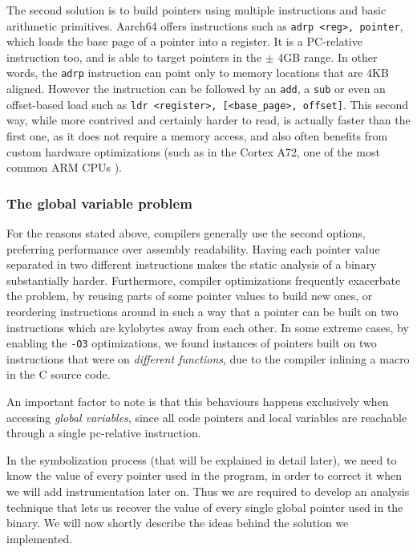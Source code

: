 \documentclass[a4paper,11pt,oneside]{report}
\begin{document}
The second solution is to build pointers using multiple instructions and basic 
arithmetic primitives. Aarch64 offers instructions such as \texttt{adrp <reg>, 
pointer}, which loads the base page of a pointer into a register. It is a 
PC-relative instruction too, and is able to target pointers in the $\pm$ 4GB 
range. In other words, the \texttt{adrp} instruction can point only to memory 
locations that are 4KB aligned. However the instruction can be followed by an 
\texttt{add}, a \texttt{sub} or even an offset-based load such as \texttt{ldr 
<register>, [<base\_page>, offset]}. This second way, while more contrived and 
certainly harder to read, is actually faster than the first one, as it does not 
require a memory access, and also often benefits from custom hardware 
optimizations (such as in the Cortex A72, one of the most common ARM CPUs 
\cite{pointeroptimizations}). 

\subsubsection{The global variable problem}
For the reasons stated above, compilers generally use the second options, 
preferring performance over assembly readability. Having each pointer value 
separated in two different instructions makes the static analysis of a binary 
substantially harder. Furthermore, compiler optimizations frequently exacerbate 
the problem, by reusing parts of some pointer values to build new ones, or 
reordering instructions around in such a way that a pointer can be built on two 
instructions which are kylobytes away from each other. In some extreme cases, 
by enabling the \texttt{-O3} optimizations, we found instances of pointers 
built on two instructions that were on \emph{different functions}, due to the 
compiler inlining a macro in the C source code. 

An important factor to note is that this behaviours happens exclusively when 
accessing \emph{global variables}, since all code pointers and local variables 
are reachable through a single pc-relative instruction. 

In the symbolization process (that will be explained in detail later), we need 
to know the value of every pointer used in the program, in order to correct it 
when we will add instrumentation later on. Thus we are required to develop an 
analysis technique that lets us recover the value of every single global 
pointer used in the binary. We will now shortly describe the ideas behind the 
solution we implemented.
\end{document}
